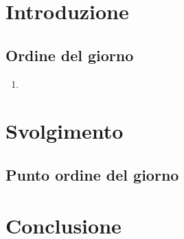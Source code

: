 \section{Introduzione}
\subsection{Ordine del giorno}
\begin{enumerate}
    \item %
\end{enumerate}

\section{Svolgimento}
\subsection{Punto ordine del giorno} %

\section{Conclusione}

